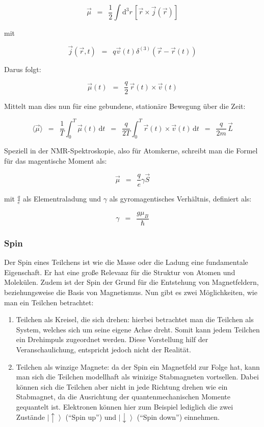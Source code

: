 \documentclass{article}
\newcommand{\widespace}{\enspace}
\newcommand{\wideeq}{\widespace = \widespace}
\begin{document}
\begin{enumerate}
    \[
        \vec{\mu}
        \wideeq \frac 1 2 \int \mathrm{d}^3 r \,
        \left[ \vec r \times \vec j (\vec r) \right]
    \]

    mit

    \[
        \vec j (\vec r, t) \wideeq q \vec v (t)
        \delta^{(3)} \left( \vec r - \vec r (t) \right)
    \]

    Darus folgt: 

    \[
        \vec{\mu}(t) \wideeq \frac{q}{2}\,\vec{r}(t)\times \vec{v}(t)
    \]

    Mittelt man dies nun für eine gebundene, stationäre Bewegung über die Zeit:

    \[
        \langle \vec{\mu} \rangle
        \wideeq \frac 1 T \int_0^T \vec{\mu}(t) \, \mathrm{d}t
        \wideeq \frac{q}{2T} \int_0^T \vec{r}(t) \times \vec{v}(t) \, \mathrm{d}t
        \wideeq \frac{q}{2m} \, \vec{L}
    \]

    Speziell in der NMR-Spektroskopie, also für Atomkerne, schreibt man die Formel für das magentische Moment als:

    \[
        \vec{\mu} \wideeq \frac{q}{e} \gamma \vec{S}
    \]

    mit $\frac{q}{e}$ als Elementraladung und $\gamma$ als gyromagentisches Verhältnis, definiert als:

    \[
        \gamma \wideeq \frac{g\mu_{B}}{\hbar}
    \]
    
\end{enumerate}

\subsubsection{Spin}

\cite{rptu}

\cite{chemie.de_2}

Der Spin eines Teilchens ist wie die Masse oder die Ladung eine fundamentale
Eigenschaft. Er hat eine große Relevanz für die Struktur von Atomen und Molekülen.
Zudem ist der Spin der Grund für die Entstehung von Magnetfeldern,
beziehungsweise die Basis von Magnetismus.
Nun gibt es zwei Möglichkeiten, wie man ein Teilchen betrachtet:

\begin{enumerate}
    \item Teilchen als Kreisel, die sich drehen: hierbei betrachtet man die Teilchen als System, welches sich um seine eigene Achse dreht. Somit kann jedem Teilchen ein Drehimpuls zugeordnet werden. Diese Vorstellung hilf der Veranschaulichung, entspricht jedoch nicht der Realität.
    \item Teilchen als winzige Magnete: da der Spin ein Magnetfeld zur Folge hat, kann man sich die Teilchen modellhaft als winizige Stabmagneten vortsellen. Dabei können sich die Teilchen aber nicht in jede Richtung drehen wie ein Stabmagnet, da die Ausrichtung der quantenmechanischen Momente gequantelt ist. Elektronen können hier zum Beispiel lediglich die zwei Zustände $\left| \uparrow \right>$ (``Spin up'') und $\left| \downarrow \right>$ (``Spin down'') einnehmen.

\end{enumerate}
\end{document}

